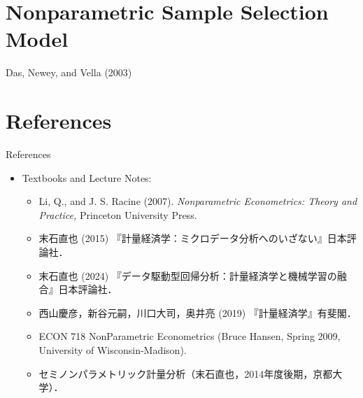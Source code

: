 \documentclass[xcolor=svgnames,dvipdfmx,cjk]{beamer}
\theoremstyle{example}
\begin{document}
\section{Nonparametric Sample Selection Model}

\begin{frame}{Das, Newey, and Vella (2003)}
      
\end{frame}



\section{References}

\begin{frame}{References}
      \begin{itemize}
            \item Textbooks and Lecture Notes:
                  \begin{itemize}
                        \item Li, Q., and J. S. Racine (2007). 
                              \textit{Nonparametric Econometrics: Theory and Practice,} 
                              Princeton University Press.
                        \item 末石直也 (2015) 『計量経済学：ミクロデータ分析へのいざない』日本評論社．
                        \item 末石直也 (2024) 『データ駆動型回帰分析：計量経済学と機械学習の融合』日本評論社．
                        \item 西山慶彦，新谷元嗣，川口大司，奥井亮 (2019) 『計量経済学』有斐閣．
                        \item ECON 718 NonParametric Econometrics (Bruce Hansen, Spring 2009, University of Wisconsin-Madison).
                        \item セミノンパラメトリック計量分析（末石直也，2014年度後期，京都大学）．
                  \end{itemize}
      \end{itemize}
\end{frame}
\end{document}
